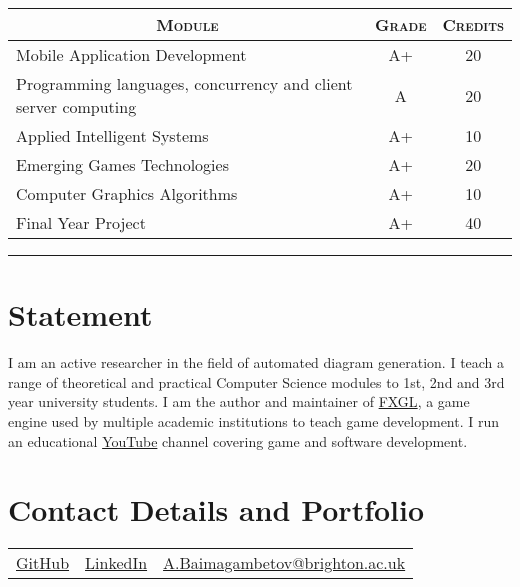 \documentclass[a4paper,10pt]{article} %
\begin{document}
\begin{center}
\begin{tabular}{lcc}
\multicolumn{1}{c}{\textsc{Module}} & \textsc{Grade}&\textsc{Credits}\\ \hline
Mobile Application Development                                  & A+ & 20\\
Programming languages, concurrency and client server computing  & A & 20\\
Applied Intelligent Systems                                     & A+ & 10\\
Emerging Games Technologies                                     & A+ & 20\\
Computer Graphics Algorithms                                    & A+ & 10\\
Final Year Project                                              & A+ & 40\\
\end{tabular}
\end{center}
\bigskip
\hrule
\vspace{1cm}

\section{Statement}

I am an active researcher in the field of automated diagram generation.
I teach a range of theoretical and practical Computer Science modules to 1st, 2nd and 3rd year
university students.
I am the author and maintainer of \href{https://github.com/AlmasB/FXGL}{FXGL}, a game engine used by multiple
academic institutions to teach game development.
I run an educational \href{https://www.youtube.com/almasb0/videos}{YouTube} channel covering
game and software development.


\section{Contact Details and Portfolio}

\begin{tabular}{c | c | c}
\href{https://github.com/AlmasB}{GitHub}
& \href{https://www.linkedin.com/in/AlmasB}{LinkedIn}
& \href{mailto:A.Baimagambetov@brighton.ac.uk}{A.Baimagambetov@brighton.ac.uk} 


\end{tabular}
\end{document}

